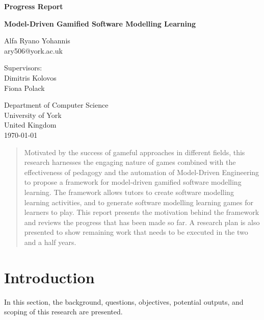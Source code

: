\documentclass[12pt, a4paper]{report} \usepackage[titletoc]{appendix}
\begin{document}
\begin{titlepage}
 \begin{center}

\textbf{Progress Report}
\vspace{1cm}

\textbf{\large Model-Driven Gamified Software Modelling Learning}
\vspace{1cm}

Alfa Ryano Yohannis\\
ary506@york.ac.uk
\vspace{1cm}

Supervisors:\\
Dimitris Kolovos\\
Fiona Polack\\
\vspace{1cm}

Department of Computer Science\\
University of York\\
United Kingdom\\
\vspace{1cm}
\today
 
\vfill
 
\end{center}
\end{titlepage}


\begin{abstract}
Motivated by the success of gameful approaches in different fields, this research harnesses the engaging nature of games combined with the effectiveness of pedagogy and the automation of Model-Driven Engineering to propose a framework for model-driven gamified software modelling learning. The framework allows tutors to create software modelling learning activities, and to generate software modelling learning games for learners to play. This report presents the motivation behind the framework and reviews the progress that has been made so far. A research plan is also presented to show remaining work that needs to be executed in the two and a half years.
\end{abstract}

\tableofcontents
{}

\listoffigures
\newpage
 
\listoftables
\newpage

\lstlistoflistings
\newpage

\chapter{Introduction}
\label{Introduction}
In this section, the background, questions, objectives, potential outputs, and scoping of this research are presented.
\end{document}
